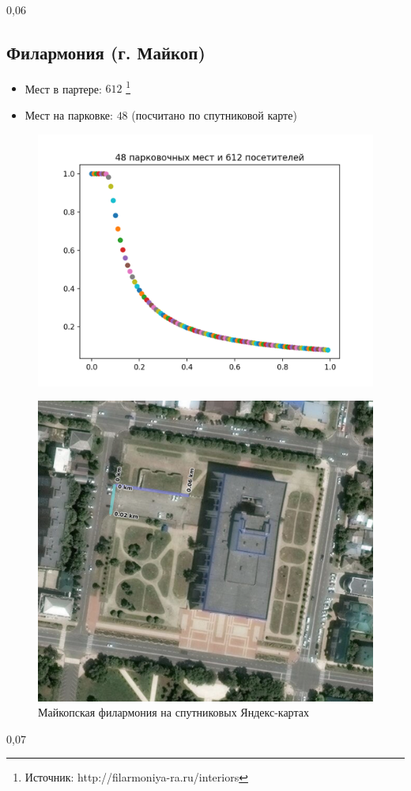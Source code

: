 0,06

\subsection{Филармония (г. Майкоп)}

\begin{itemize}
	\item Мест в партере: $612$ \footnote{Источник: http://filarmoniya-ra.ru/interiors}
	\item Мест на парковке: $48$ \small{(посчитано по спутниковой карте)}
\end{itemize}
\begin{figure}
	\includegraphics[scale=0.6]{img/612_48}	
\end{figure}

\begin{figure}
	\includegraphics[scale=0.3]{img/filarmony_parking}
	\caption{Майкопская филармония на спутниковых Яндекс-картах}
\end{figure}

0,07

